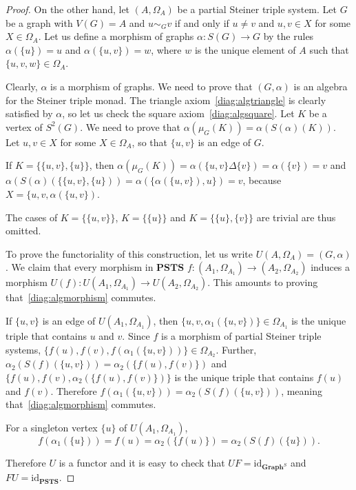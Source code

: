 \documentclass[reqno,A4paper]{amsart}
\newcommand{\id}{\mathrm{id}}
\newcommand{\PSTS}{\mathbf{PSTS}}
\newcommand{\Graph}{\mathbf{Graph}}
\theoremstyle{definition}
\numberwithin{equation}{section}
\begin{document}
\begin{proof}
On the other hand, let $(A,\Omega_A)$ be a partial Steiner triple system.
Let $G$ be a graph with $V(G)=A$ and $u\sim_G v$ if and only if $u\neq v$ and 
$u,v\in X$ for some $X\in\Omega_A$. Let us define a morphism of graphs 
$\alpha:S(G)\to G$ by the rules $\alpha(\{u\})=u$ and $\alpha(\{u,v\})=w$,
where $w$ is the unique element of $A$ such that $\{u,v,w\}\in\Omega_A$.

Clearly, $\alpha$ is a morphism of graphs. We need to prove that $(G,\alpha)$
is an algebra for the Steiner triple monad. The triangle axiom~\eqref{diag:algtriangle}
is clearly satisfied by $\alpha$, so
let us check the square axiom~\eqref{diag:algsquare}.
Let $K$ be a vertex of $S^2(G)$. We need to prove that $\alpha(\mu_G(K))=\alpha(S(\alpha)(K))$.
Let $u,v\in X$ for some $X\in\Omega_A$, so that $\{u,v\}$ is an edge of $G$. 

If $K=\{\{u,v\},\{u\}\}$, 
then
$\alpha(\mu_G(K))=\alpha(\{u,v\}\Delta\{v\})=\alpha(\{v\})=v$ and $\alpha(S(\alpha)(\{\{u,v\},\{u\}))=
\alpha(\{\alpha(\{u,v\}),u\})=v$, because $X=\{u,v,\alpha(\{u,v\})$.

The cases of $K=\{\{u,v\}\}$, $K=\{\{u\}\}$ and $K=\{\{u\},\{v\}\}$ are trivial are thus omitted.

To prove the functoriality of this construction,
let us write $U(A,\Omega_A)=(G,\alpha)$. We claim that every morphism
in $\PSTS$ $f:(A_1,\Omega_{A_1})\to(A_2,\Omega_{A_2})$ induces
a morphism $U(f):U(A_1,\Omega_{A_1})\to U(A_2,\Omega_{A_2})$. This amounts
to proving that~\eqref{diag:algmorphism} commutes.

If $\{u,v\}$ is an edge of $U(A_1,\Omega_{A_1})$, then
$\{u,v,\alpha_1(\{u,v\})\}\in \Omega_{A_1}$ is the unique triple
that contains $u$ and $v$. Since $f$ is a morphism of partial Steiner triple
systems, $\{f(u),f(v),f(\alpha_1(\{u,v\}))\}\in \Omega_{A_2}$. Further,
$\alpha_2(S(f)(\{u,v\}))=\alpha_2(\{f(u),f(v)\})$ and
$\{f(u),f(v),\alpha_2(\{f(u),f(v)\})\}$ is the unique triple that contains
$f(u)$ and $f(v)$. Therefore $f(\alpha_1(\{u,v\}))=\alpha_2(S(f)(\{u,v\}))$,
meaning that~\eqref{diag:algmorphism} commutes.

For a singleton vertex $\{u\}$ of $U(A_1,\Omega_{A_1})$, 
$$
f(\alpha_1(\{u\}))=f(u)=\alpha_2(\{f(u)\})=\alpha_2(S(f)(\{u\})).
$$

Therefore $U$ is a functor and it is easy to check that
$UF=\id_{\Graph^S}$ and $FU=\id_\PSTS$.
\end{proof}
\end{document}
